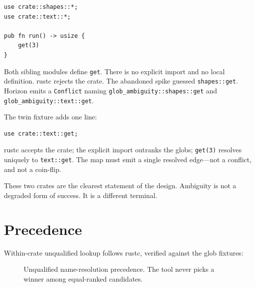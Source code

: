 \documentclass[11pt,a4paper,oneside]{report}
\newcommand{\horizon}{Horizon}
\begin{document}
\begin{lstlisting}
use crate::shapes::*;
use crate::text::*;

pub fn run() -> usize {
    get(3)
}
\end{lstlisting}

Both sibling modules define \texttt{get}. There is no explicit import and no
local definition. rustc rejects the crate. The abandoned spike guessed
\texttt{shapes::get}. \horizon{} emits a \texttt{Conflict} naming
\texttt{glob\_ambiguity::shapes::get} and \texttt{glob\_ambiguity::text::get}.

The twin fixture adds one line:

\begin{lstlisting}
use crate::text::get;
\end{lstlisting}

rustc accepts the crate; the explicit import outranks the globs;
\texttt{get(3)} resolves uniquely to \texttt{text::get}. The map must emit a
single resolved edge---not a conflict, and not a coin-flip.

These two crates are the clearest statement of the design. Ambiguity is not a
degraded form of success. It is a different terminal.

\section{Precedence}
\label{sec:precedence}

Within-crate unqualified lookup follows rustc, verified against the glob
fixtures:

\begin{figure}[ht]
\centering
{}
\caption{Unqualified name-resolution precedence. The tool never picks a
  winner among equal-ranked candidates.}
\label{fig:precedence}
\end{figure}
\end{document}
